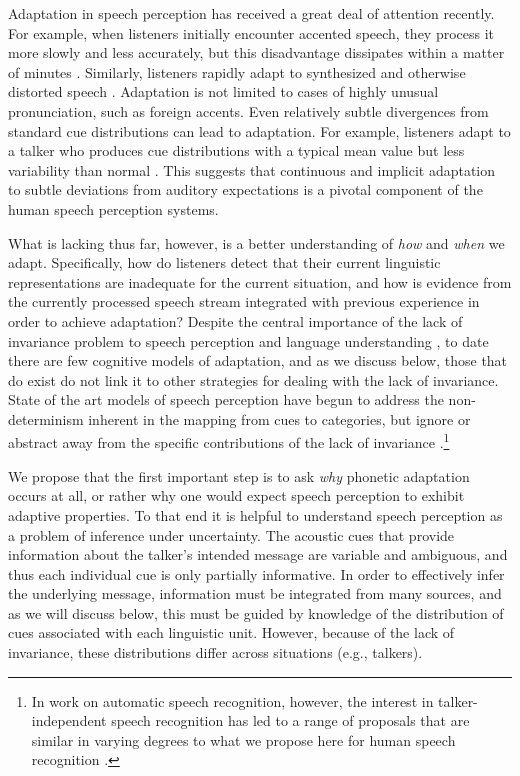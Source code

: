 Adaptation in speech perception has received a great deal of attention recently. For example, when listeners initially encounter accented speech, they process it more slowly and less accurately, but this disadvantage dissipates within a matter of minutes \autocite[][and references therein]{Bradlow2008,Clarke2004}. Similarly, listeners rapidly adapt to synthesized and otherwise distorted speech \autocite[e.g.,][]{Davis2005}. Adaptation is not limited to cases of highly unusual pronunciation, such as foreign accents. Even relatively subtle divergences from standard cue distributions can lead to adaptation.  For example, listeners adapt to a talker who produces cue distributions with a typical mean value but less variability than normal \autocite{Clayards2008}.  This suggests that continuous and implicit adaptation to subtle deviations from auditory expectations is a pivotal component of the human speech perception systems.

What is lacking thus far, however, is a better understanding of \emph{how} and \emph{when} we adapt.  Specifically, how do listeners detect that their current linguistic representations are inadequate for the current situation, and how is evidence from the currently processed speech stream integrated with previous experience in order to achieve adaptation?   Despite the central importance of the lack of invariance problem to speech perception and language understanding \autocite{Liberman1967,Pardo2006}, to date there are few cognitive models of adaptation, and as we discuss below, those that do exist do not link it to other strategies for dealing with the lack of invariance.  State of the art models of speech perception have begun to address the non-determinism inherent in the mapping from cues to categories, but ignore or abstract away from the specific contributions of the lack of invariance \autocite{Feldman2009a,Feldman2013a,Norris2008}.\footnote{In work on automatic speech recognition, however, the interest in talker-independent speech recognition has led to a range of proposals that are similar in varying degrees to what we propose here for human speech recognition \autocite[e.g.,][]{Gauvain1994,Leggetter1995,Shinoda2001}.}

We propose that the first important step is to ask {\em why} phonetic adaptation occurs at all, or rather why one would expect speech perception to exhibit adaptive properties.
To that end it is helpful to understand speech perception as a problem of inference under uncertainty.
The acoustic cues that provide information about the talker's intended message are variable and ambiguous, and thus each individual cue is only partially informative.
In order to effectively infer the underlying message, information must be integrated from many sources, and as we will discuss below, this must be guided by knowledge of the distribution of cues associated with each linguistic unit.  However, because of the lack of invariance, these distributions differ across situations (e.g., talkers).

